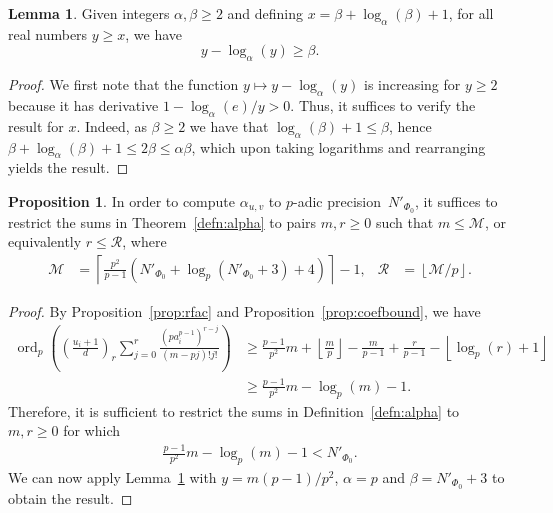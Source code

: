 \documentclass[a4paper,11pt]{article}
\numberwithin{equation}{section}
\providecommand{\floor}[1]{\left\lfloor#1\right\rfloor}   %
\providecommand{\ceil}[1]{\left\lceil#1\right\rceil}   %
\DeclareMathOperator{\ord}{ord}          %
\theoremstyle{definition}
\newtheorem{lem}[thm]{Lemma}
\newtheorem{prop}[thm]{Proposition}
\begin{document}
\begin{lem} \label{lem:log}
Given integers $\alpha, \beta \geq 2$ and defining 
$x = \beta + \log_{\alpha}(\beta) + 1$, 
for all real numbers $y \geq x$,
we have 
\begin{equation*}
y - \log_{\alpha}(y) \geq \beta.
\end{equation*}
\end{lem}

\begin{proof}
We first note that the function $y \mapsto y - \log_{\alpha}(y)$ is increasing 
for $y \geq 2$ because it has derivative $1 - \log_{\alpha}(e)/y > 0$.  Thus, 
it suffices to verify the result for $x$.  Indeed, as $\beta \geq 2$ we have 
that $\log_{\alpha}(\beta) + 1 \leq \beta$, hence 
$\beta + \log_{\alpha}(\beta) + 1 \leq 2 \beta \leq \alpha \beta$,
which upon taking logarithms and rearranging yields the result.
\end{proof}

\begin{prop} \label{prop:MR}
In order to compute $\alpha_{u,v}$ to $p$-adic precision~$N'_{\Phi_0}$, 
it suffices to restrict the sums in Theorem~\ref{defn:alpha} to pairs $m,r \geq 0$ 
such that $m \leq \mathcal{M}$, or equivalently $r \leq \mathcal{R}$, where 
\begin{align*}
\mathcal{M} &= \ceil{\frac{p^2}{p-1}(N'_{\Phi_0}+\log_p(N'_{\Phi_0}+3)+4)} - 1,
&\mathcal{R} &= \floor{\mathcal{M}/p}.
\end{align*}
\end{prop}

\begin{proof}
By Proposition~\ref{prop:rfac} and Proposition~\ref{prop:coefbound}, we have
\begin{align*}
\ord_p \left( \left( \frac{u_i+1}{d} \right)_r \sum_{j=0}^{r} \frac{(p a_i^{p-1})^{r-j}}{(m-pj)!j!} \right) &\geq  \frac{p-1}{p^2}m + \floor{\frac{m}{p}}-\frac{m}{p-1}+\frac{r}{p-1}-\floor{\log_p(r)+1} \\
													  &\geq  \frac{p-1}{p^2}m - \log_p(m)-1.
\end{align*}
Therefore, it is sufficient to restrict the sums in Definition~\ref{defn:alpha} to $m,r \geq 0$ for which
\begin{align*}
\frac{p-1}{p^2}m - \log_p(m) -1 < N'_{\Phi_0}. 
\end{align*}
We can now apply Lemma~\ref{lem:log} with $y=m(p-1)/p^2$, $\alpha=p$ and $\beta=N'_{\Phi_0}+3$ to obtain the result.
\end{proof}
\end{document}

